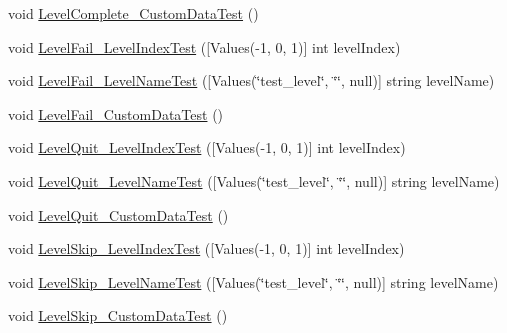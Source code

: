 \begin{DoxyCompactItemize}
\item 
void \mbox{\hyperlink{class_unity_engine_1_1_analytics_1_1_tests_1_1_analytics_event_tests_aea4855a142b57e9d3fdadf690584ea05}{Level\+Complete\+\_\+\+Custom\+Data\+Test}} ()
\item 
void \mbox{\hyperlink{class_unity_engine_1_1_analytics_1_1_tests_1_1_analytics_event_tests_af8a5ce085f481179bbffd19e5a451d82}{Level\+Fail\+\_\+\+Level\+Index\+Test}} (\mbox{[}Values(-\/1, 0, 1)\mbox{]} int level\+Index)
\item 
void \mbox{\hyperlink{class_unity_engine_1_1_analytics_1_1_tests_1_1_analytics_event_tests_a859fd8465a51a694a514f3de2d5d6abf}{Level\+Fail\+\_\+\+Level\+Name\+Test}} (\mbox{[}Values(\char`\"{}test\+\_\+level\char`\"{}, \char`\"{}\char`\"{}, null)\mbox{]} string level\+Name)
\item 
void \mbox{\hyperlink{class_unity_engine_1_1_analytics_1_1_tests_1_1_analytics_event_tests_a9d94c1dff695c310f53758184b270332}{Level\+Fail\+\_\+\+Custom\+Data\+Test}} ()
\item 
void \mbox{\hyperlink{class_unity_engine_1_1_analytics_1_1_tests_1_1_analytics_event_tests_ad230f0efbe5490c23a260792bf7ad8aa}{Level\+Quit\+\_\+\+Level\+Index\+Test}} (\mbox{[}Values(-\/1, 0, 1)\mbox{]} int level\+Index)
\item 
void \mbox{\hyperlink{class_unity_engine_1_1_analytics_1_1_tests_1_1_analytics_event_tests_ad352d29dc68c83fc8b344ac373431d9d}{Level\+Quit\+\_\+\+Level\+Name\+Test}} (\mbox{[}Values(\char`\"{}test\+\_\+level\char`\"{}, \char`\"{}\char`\"{}, null)\mbox{]} string level\+Name)
\item 
void \mbox{\hyperlink{class_unity_engine_1_1_analytics_1_1_tests_1_1_analytics_event_tests_aa83d795e9056007165ebbcca2661669a}{Level\+Quit\+\_\+\+Custom\+Data\+Test}} ()
\item 
void \mbox{\hyperlink{class_unity_engine_1_1_analytics_1_1_tests_1_1_analytics_event_tests_a778a0a9926ac886544c90a567d92546a}{Level\+Skip\+\_\+\+Level\+Index\+Test}} (\mbox{[}Values(-\/1, 0, 1)\mbox{]} int level\+Index)
\item 
void \mbox{\hyperlink{class_unity_engine_1_1_analytics_1_1_tests_1_1_analytics_event_tests_a2bbed3b5cf2d230df504df37e80b4800}{Level\+Skip\+\_\+\+Level\+Name\+Test}} (\mbox{[}Values(\char`\"{}test\+\_\+level\char`\"{}, \char`\"{}\char`\"{}, null)\mbox{]} string level\+Name)
\item 
void \mbox{\hyperlink{class_unity_engine_1_1_analytics_1_1_tests_1_1_analytics_event_tests_a7ebbb3403b9d8d9b896f29d039327796}{Level\+Skip\+\_\+\+Custom\+Data\+Test}} ()

\end{DoxyCompactItemize}
